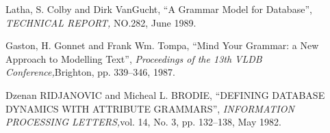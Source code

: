 \thispagestyle{myheadings}






\begin{thebibliography}{参考文献}

  Latha, S. Colby and Dirk VanGucht,
  ``A Grammar Model for Database'',
  {\it TECHNICAL REPORT,} NO.282,
  June 1989.

  Gaston, H. Gonnet and Frank Wm. Tompa,
  ``Mind Your Grammar: a New Approach to Modelling Text'',
  {\it Proceedings of the 13th VLDB Conference,}Brighton,
  pp. 339--346, 1987.

  Dzenan RIDJANOVIC and Micheal L. BRODIE,
  ``DEFINING DATABASE DYNAMICS WITH ATTRIBUTE GRAMMARS'',
  {\it INFORMATION PROCESSING LETTERS,}vol. 14, No. 3,
  pp. 132--138, May 1982.




\end{thebibliography}

